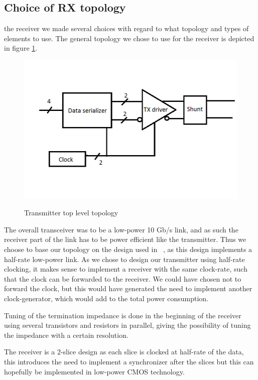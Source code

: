 \subsection{Choice of RX topology}

 the receiver we made several choices with regard to what topology and types of elements to use. The general topology we chose to use for the receiver is depicted in figure \ref{fig:topology}.

\begin{figure}[H]
  \centering
  {\includegraphics[scale=0.55]{img/topology_tx.png}}
  \caption{Transmitter top level topology}
  \label{fig:topology}
\end{figure}


The overall transceiver was to be a low-power 10 Gb/s link, and as such the receiver part of the link has to be power efficient like the transmitter. Thus we choose to base our topology on the design used in ~\cite{mahony2010a}, as this design implements a half-rate low-power link. As we chose to design our transmitter using half-rate clocking, it makes sense to implement a receiver with the same clock-rate, such that the clock can be forwarded to the receiver. We could have chosen not to forward the clock, but this would have generated the need to implement another clock-generator, which would add to the total power consumption.


Tuning of the termination impedance is done in the beginning of the receiver using several transistors and resistors in parallel, giving the possibility of tuning the impedance with a certain resolution.

The receiver is a 2-slice design as each slice is clocked at half-rate of the data, this introduces the need to implement a synchronizer after the slices but this can hopefully be implemented in low-power CMOS technology.

